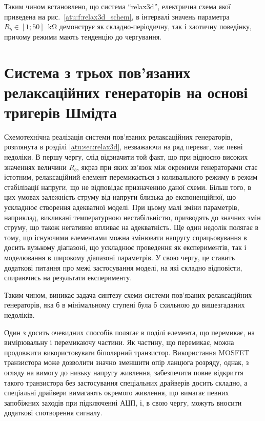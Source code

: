 Таким чином встановлено, що система ``relax3d'', електрична схема
якої приведена на рис.~\ref{atu:f:relax3d_schem}, в інтервалі значень
параметра
$R_b \in [1; 50] \; \SI{}{ \kilo \ohm} $ демонструє як складно-періодичну,
так і хаотичну поведінку, причому режими мають тенденцію до
чергування.

\section{Система з трьох пов'язаних релаксаційних генераторів на основі тригерів Шмідта}
\label{atu:sec:relax3ds}

Схемотехнічна реалізація системи пов'язаних релаксаційних
генераторів, розглянута в розділі \ref{atu:sec:relax3d}, незважаючи на
ряд переваг, має певні недоліки. В першу чергу, слід відзначити
той факт, що при відносно високих значеннях величини
$R_b $, якраз при яких зв'язок між окремими генераторами стає
істотним, релаксаційний елемент перемикається з коливального
режиму в режим стабілізації напруги, що не відповідає
призначенню даної схеми. Більш того, в цих умовах залежність
струму від напруги близька до експоненційної, що ускладнює
створення адекватної моделі. При цьому малі зміни параметрів,
наприклад, викликані температурною нестабільністю, призводять
до значних змін струму, що також негативно впливає
на адекватність. Ще один недолік полягає в тому, що існуючими
елементами можна змінювати напругу спрацьовування в досить
вузькому діапазоні, що ускладнює проведення як експериментів,
так і моделювання в широкому діапазоні параметрів. У свою чергу,
це ставить додаткові питання про межі застосування моделі, на
які складно відповісти, спираючись на результати експерименту.

Таким чином, виникає задача синтезу схеми системи пов'язаних
релаксаційних генераторів, яка б в мінімальному ступені була
б схильною до вищезгаданих недоліків.

Один з досить очевидних способів полягає в поділі
елемента, що перемикає, на вимірювальну і перемикаючу частини. Як
частину, що перемикає, можна продовжити використовувати біполярний
транзистор. Використання MOSFET транзистора може дозволити значно
зменшити опір ланцюга розряду, однак, з огляду на вимогу до
низьку напругу живлення, забезпечити повне відкриття такого
транзистора без застосування спеціальних драйверів досить
складно, а спеціальні драйвери вимагають окремого живлення,
що вимагає певних запобіжних заходів при підключенні АЦП, і,
в свою чергу, можуть вносити додаткові спотворення сигналу.

